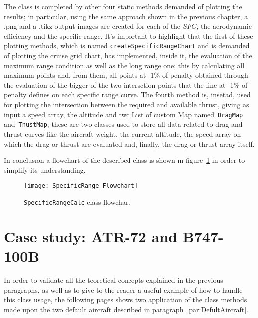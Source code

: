 \bigskip
\noindent
The class is completed by other four static methods demanded of plotting the results; in particular, using the same approach shown in the previous chapter, a .png and a .tikz output images are created for each of the $SFC$, the aerodynamic efficiency and the specific range.
%
It's important to highlight that the first of these plotting methods, which is named \lstinline[language=Java]!createSpecificRangeChart! and is demanded of plotting the cruise grid chart, has implemented, inside it, the evaluation of the maximum range condition as well as the long range one; this by calculating all maximum points and, from them, all points at -1\% of penalty obtained through the evaluation of the bigger of the two intersction points that the line at -1\% of penalty defines on each specific range curve.
%
\noindent
The fourth method is, insetad, used for plotting the intersection between the required and available thrust, giving as input a speed array, the altitude and two \gls{List} of custom \gls{Map} named~\lstinline[language=Java]!DragMap! and~\lstinline[language=Java]!ThustMap!; these are two classes used to store all data related to drag and thrust curves like the aircraft weight, the current altitude, the speed array on which the drag or thrust are evaluated and, finally, the drag or thrust array itself.  

\bigskip
\noindent
In conclusion a flowchart of the described class is shown in figure~\ref{fig:Figure7} in order to simplify its understanding.
%
\begin{figure}[t]
\centering
\texttt{[image: SpecificRange\_Flowchart]}
\caption{\lstinline[language=Java]!SpecificRangeCalc! class flowchart}
\label{fig:Figure7}
\end{figure}
%
\section{Case study: ATR-72 and B747-100B}
%
In order to validate all the teoretical concepts explained in the previous paragraphs, as well as to give to the reader a useful example of how to handle this class usage, the following pages shows two application of the class methods made upon the two default aircraft described in paragraph~\ref{par:DefultAircraft}.

